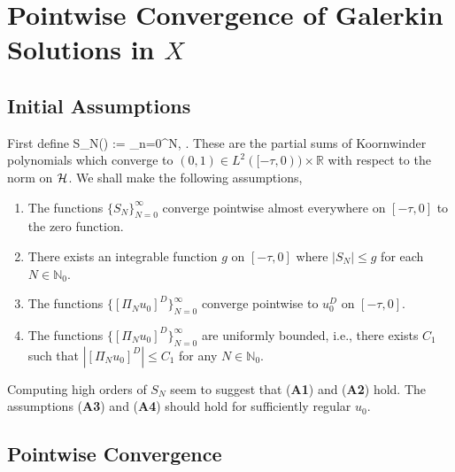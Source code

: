 
\section{Pointwise Convergence of Galerkin Solutions in \(X\)}

\subsection{Initial Assumptions}

First define 
\be
    S_N(\theta) := \sum_{n=0}^N, \qquad \theta\in[-\tau, 0].
\ee
These are the partial sums of Koornwinder polynomials which converge to \((0, 1)\in L^2([-\tau, 0))\times \mathbb R\) with respect to the norm on \(\mathcal H\). We shall make the following assumptions,
\begin{enumerate}[label=(\textbf{A\arabic*})]
\item The functions \(\{S_N\}_{N=0}^\infty\) converge pointwise almost everywhere on \([-\tau,0]\) to the zero function.
\item There exists an integrable function \(g\) on \([-\tau, 0]\) where \(|S_N| \leq g\) for each \(N\in\mathbb N_0\).
\item The functions \(\{ [\Pi_N u_0]^D\}_{N=0}^\infty\) converge pointwise to \(u_0^D\) on \([-\tau, 0]\).
\item The functions \(\{ [\Pi_N u_0]^D\}_{N=0}^\infty\) are uniformly bounded, i.e., there exists \(C_1\) such that \(|[\Pi_N u_0]^D| \leq C_1\) for any \(N\in\mathbb N_0\).
\end{enumerate}
Computing high orders of \(S_N\) seem to suggest that (\textbf{A1}) and (\textbf{A2}) hold. The assumptions (\textbf{A3}) and (\textbf{A4}) should hold for sufficiently regular \(u_0\).

\subsection{Pointwise Convergence}

